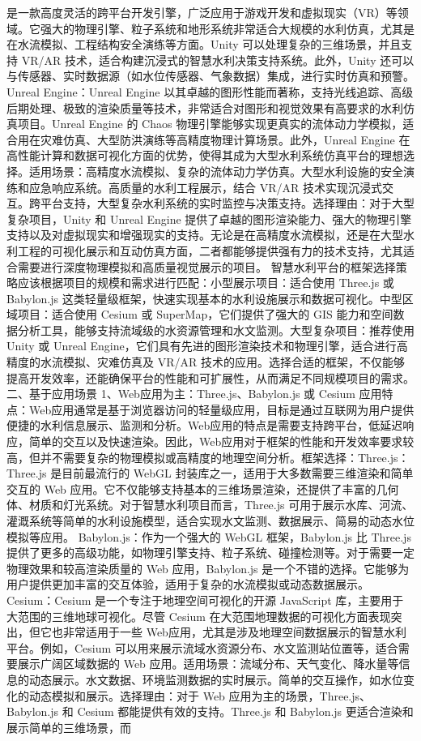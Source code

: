 {{{是一款高度灵活的跨平台开发引擎，广泛应用于游戏开发和虚拟现实（VR）等领域。它强大的物理引擎、粒子系统和地形系统非常适合大规模的水利仿真，尤其是在水流模拟、工程结构安全演练等方面。Unity 可以处理复杂的三维场景，并且支持 VR/AR 技术，适合构建沉浸式的智慧水利决策支持系统。此外，Unity 还可以与传感器、实时数据源（如水位传感器、气象数据）集成，进行实时仿真和预警。 Unreal Engine：Unreal Engine 以其卓越的图形性能而著称，支持光线追踪、高级后期处理、极致的渲染质量等技术，非常适合对图形和视觉效果有高要求的水利仿真项目。Unreal Engine 的 Chaos 物理引擎能够实现更真实的流体动力学模拟，适合用在灾难仿真、大型防洪演练等高精度物理计算场景。此外，Unreal Engine 在高性能计算和数据可视化方面的优势，使得其成为大型水利系统仿真平台的理想选择。适用场景：高精度水流模拟、复杂的流体动力学仿真。大型水利设施的安全演练和应急响应系统。高质量的水利工程展示，结合 VR/AR 技术实现沉浸式交互。跨平台支持，大型复杂水利系统的实时监控与决策支持。选择理由：对于大型复杂项目，Unity 和 Unreal Engine 提供了卓越的图形渲染能力、强大的物理引擎支持以及对虚拟现实和增强现实的支持。无论是在高精度水流模拟，还是在大型水利工程的可视化展示和互动仿真方面，二者都能够提供强有力的技术支持，尤其适合需要进行深度物理模拟和高质量视觉展示的项目。 智慧水利平台的框架选择策略应该根据项目的规模和需求进行匹配：小型展示项目：适合使用 Three.js 或 Babylon.js 这类轻量级框架，快速实现基本的水利设施展示和数据可视化。中型区域项目：适合使用 Cesium 或 SuperMap，它们提供了强大的 GIS 能力和空间数据分析工具，能够支持流域级的水资源管理和水文监测。大型复杂项目：推荐使用 Unity 或 Unreal Engine，它们具有先进的图形渲染技术和物理引擎，适合进行高精度的水流模拟、灾难仿真及 VR/AR 技术的应用。选择合适的框架，不仅能够提高开发效率，还能确保平台的性能和可扩展性，从而满足不同规模项目的需求。 二、基于应用场景 1、Web应用为主：Three.js、Babylon.js 或 Cesium 应用特点：Web应用通常是基于浏览器访问的轻量级应用，目标是通过互联网为用户提供便捷的水利信息展示、监测和分析。Web应用的特点是需要支持跨平台，低延迟响应，简单的交互以及快速渲染。因此，Web应用对于框架的性能和开发效率要求较高，但并不需要复杂的物理模拟或高精度的地理空间分析。框架选择：Three.js：Three.js 是目前最流行的 WebGL 封装库之一，适用于大多数需要三维渲染和简单交互的 Web 应用。它不仅能够支持基本的三维场景渲染，还提供了丰富的几何体、材质和灯光系统。对于智慧水利项目而言，Three.js 可用于展示水库、河流、灌溉系统等简单的水利设施模型，适合实现水文监测、数据展示、简易的动态水位模拟等应用。 Babylon.js：作为一个强大的 WebGL 框架，Babylon.js 比 Three.js 提供了更多的高级功能，如物理引擎支持、粒子系统、碰撞检测等。对于需要一定物理效果和较高渲染质量的 Web 应用，Babylon.js 是一个不错的选择。它能够为用户提供更加丰富的交互体验，适用于复杂的水流模拟或动态数据展示。 Cesium：Cesium 是一个专注于地理空间可视化的开源 JavaScript 库，主要用于大范围的三维地球可视化。尽管 Cesium 在大范围地理数据的可视化方面表现突出，但它也非常适用于一些 Web应用，尤其是涉及地理空间数据展示的智慧水利平台。例如，Cesium 可以用来展示流域水资源分布、水文监测站位置等，适合需要展示广阔区域数据的 Web 应用。适用场景：流域分布、天气变化、降水量等信息的动态展示。水文数据、环境监测数据的实时展示。简单的交互操作，如水位变化的动态模拟和展示。选择理由：对于 Web 应用为主的场景，Three.js、Babylon.js 和 Cesium 都能提供有效的支持。Three.js 和 Babylon.js 更适合渲染和展示简单的三维场景，而 }}}
